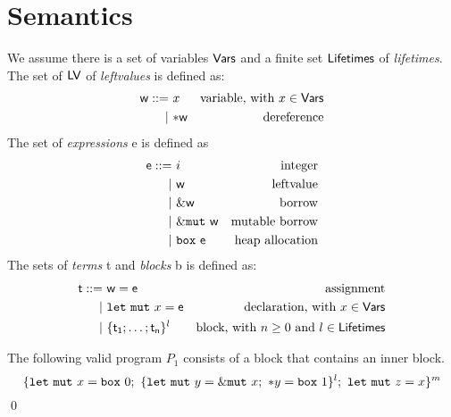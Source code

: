 \section{Semantics}\label{sec:semantics}

\begin{definition}
  We assume there is a set of variables $\mathsf{Vars}$
  and a finite set $\mathsf{Lifetimes}$ of \emph{lifetimes}.
  The set of $\mathsf{LV}$ of \emph{leftvalues} is defined as:
  \begin{align*}
    \mathsf{w} ::= &\ x & \text{variable, with $x\in\mathsf{Vars}$}\\
    | &\ \mathtt{*}\mathsf{w} & \text{dereference}
  \end{align*}
  The set of \emph{expressions} \textsf{e} is defined as
  \begin{align*}
    \mathsf{e} ::= &\ i & \text{integer}\\
    | &\ \mathsf{w} & \text{leftvalue}\\
    | &\ \&\mathsf{w} & \text{borrow}\\
    | &\ \&\mathtt{mut}\ \mathsf{w} & \text{mutable borrow}\\
    | &\ \mathtt{box}\ \mathsf{e} & \text{heap allocation}
  \end{align*}
  The sets of \emph{terms} \textsf{t} and \emph{blocks} \textsf{b}
  is defined as:
  \begin{align*}
    \mathsf{t} ::= &\ \mathsf{w}=\mathsf{e} & \text{assignment}\\
    | &\ \mathtt{let\ mut}\ x=\mathsf{e} & \text{declaration, with $x\in\mathsf{Vars}$}\\
    | &\ \{\mathsf{t_1};\ldots;\mathsf{t_n}\}^l & \text{block, with $n\ge 0$ and $l\in\mathsf{Lifetimes}$}
  \end{align*}
\end{definition}

\begin{example}\label{ex:program}
  The following valid program $P_1$ consists of a block that contains an inner block.
  \[
    \{
      \mathtt{let\ mut}\ x = \mathtt{box}\ 0;\
      \{\mathtt{let\ mut}\ y = \&\mathtt{mut}\  x;\
      \mathtt{*}y = \mathtt{box}\ 1\}^l;\
      \mathtt{let\ mut}\ z = x
    \}^m
  \]
  \qed
\end{example}

